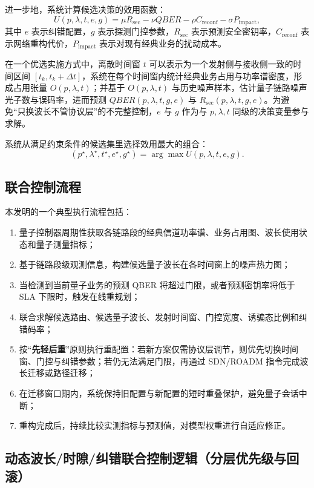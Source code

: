 \documentclass[12pt,a4paper]{article}
\begin{document}
进一步地，系统计算候选决策的效用函数：
\[
U(p,\lambda,t,e,g)=\mu R_{\mathrm{sec}}-\nu QBER-\rho C_{\mathrm{reconf}}-\sigma P_{\mathrm{impact}},
\]
其中 $e$ 表示纠错配置，$g$ 表示探测门控参数，$R_{\mathrm{sec}}$ 表示预测安全密钥率，$C_{\mathrm{reconf}}$ 表示网络重构代价，$P_{\mathrm{impact}}$ 表示对现有经典业务的扰动成本。

在一个优选实施方式中，离散时间窗 $t$ 可以表示为一个发射侧与接收侧一致的时间区间 $[t_k, t_k+\Delta t]$，系统在每个时间窗内统计经典业务占用与功率谱密度，形成占用张量 $O(p,\lambda,t)$；并基于 $O(p,\lambda,t)$ 与历史噪声样本，估计量子链路噪声光子数与误码率，进而预测 $QBER(p,\lambda,t,g,e)$ 与 $R_{\mathrm{sec}}(p,\lambda,t,g,e)$。为避免“只换波长不管协议层”的不完整控制，$e$ 与 $g$ 作为与 $p,\lambda,t$ 同级的决策变量参与求解。

系统从满足约束条件的候选集里选择效用最大的组合：
\[
(p^\star,\lambda^\star,t^\star,e^\star,g^\star)
=\arg\max U(p,\lambda,t,e,g).
\]

\subsection{联合控制流程}

本发明的一个典型执行流程包括：
\begin{enumerate}[label=\textbf{S\arabic*.}]
    \item 量子控制器周期性获取各链路段的经典信道功率谱、业务占用图、波长使用状态和量子测量指标；
    \item 基于链路段级观测信息，构建候选量子波长在各时间窗上的噪声热力图；
    \item 当检测到当前量子业务的预测 QBER 将超过门限，或者预测密钥率将低于 SLA 下限时，触发在线重规划；
    \item 联合求解候选路由、候选量子波长、发射时间窗、门控宽度、诱骗态比例和纠错码率；
    \item 按“\textbf{先轻后重}”原则执行重配置：若新方案仅需协议层调节，则优先切换时间窗、门控与纠错参数；若仍无法满足门限，再通过 SDN/ROADM 指令完成波长迁移或路径迁移；
    \item 在迁移窗口期内，系统保持旧配置与新配置的短时重叠保护，避免量子会话中断；
    \item 重构完成后，持续比较实测指标与预测值，对模型权重进行自适应修正。
\end{enumerate}

\subsection{动态波长/时隙/纠错联合控制逻辑（分层优先级与回滚）}
\end{document}
